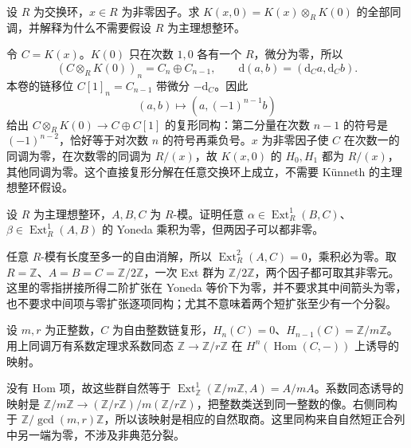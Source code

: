 \begin{exercise}\label{b4:ex:09-koszul-zero-factor}
	设 \(R\) 为交换环，\(x\in R\) 为非零因子。求 \(K(x,0)=K(x)\otimes_R K(0)\) 的全部同调，并解释为什么不需要假设 \(R\) 为主理想整环。
\end{exercise}
\begin{solution}
	令 \(C=K(x)\)。\(K(0)\) 只在次数 \(1,0\) 各有一个 \(R\)，微分为零，所以
	\[
		(C\otimes_RK(0))_n=C_n\oplus C_{n-1},\qquad \mathrm{d}(a,b)=(\mathrm{d}_Ca,\mathrm{d}_Cb).
	\]
	本卷的链移位 \(C[1]_n=C_{n-1}\) 带微分 \(-\mathrm{d}_C\)。因此
	\[
		(a,b)\longmapsto(a,(-1)^{n-1}b)
	\]
	给出 \(C\otimes_RK(0)\to C\oplus C[1]\) 的复形同构：第二分量在次数 \(n-1\) 的符号是 \((-1)^{n-2}\)，恰好等于对次数 \(n\) 的符号再乘负号。\(x\) 为非零因子使 \(C\) 在次数一的同调为零，在次数零的同调为 \(R/(x)\)，故 \(K(x,0)\) 的 \(H_0,H_1\) 都为 \(R/(x)\)，其他同调为零。这个直接复形分解在任意交换环上成立，不需要 Künneth 的主理想整环假设。
\end{solution}

\begin{exercise}\label{b4:ex:09-extension-zero-product}
	设 \(R\) 为主理想整环，\(A,B,C\) 为 \(R\)-模。证明任意 \(\alpha\in\operatorname{Ext}_R^1(B,C)\)、\(\beta\in\operatorname{Ext}_R^1(A,B)\) 的 Yoneda 乘积为零，但两因子可以都非零。
\end{exercise}
\begin{solution}
	任意 \(R\)-模有长度至多一的自由消解，所以 \(\operatorname{Ext}_R^2(A,C)=0\)，乘积必为零。取 \(R=\mathbb Z\)、\(A=B=C=\mathbb Z/2\mathbb Z\)，一次 Ext 群为 \(\mathbb Z/2\mathbb Z\)，两个因子都可取其非零元。这里的零指拼接所得二阶扩张在 Yoneda 等价下为零，并不要求其中间箭头为零，也不要求中间项与零扩张逐项同构；尤其不意味着两个短扩张至少有一个分裂。
\end{solution}

\begin{exercise}\label{b4:ex:09-uct-coefficient-map}
	设 \(m,r\) 为正整数，\(C\) 为自由整数链复形，\(H_n(C)=0\)、\(H_{n-1}(C)=\mathbb Z/m\mathbb Z\)。用上同调万有系数定理求系数同态 \(\mathbb Z\to\mathbb Z/r\mathbb Z\) 在 \(H^n(\operatorname{Hom}(C,-))\) 上诱导的映射。
\end{exercise}
\begin{solution}
	没有 Hom 项，故这些群自然等于 \(\operatorname{Ext}_{\mathbb Z}^1(\mathbb Z/m\mathbb Z,A)=A/mA\)。系数同态诱导的映射是 \(\mathbb Z/m\mathbb Z\to(\mathbb Z/r\mathbb Z)/m(\mathbb Z/r\mathbb Z)\)，把整数类送到同一整数的像。右侧同构于 \(\mathbb Z/\gcd(m,r)\mathbb Z\)，所以该映射是相应的自然取商。这里同构来自自然短正合列中另一端为零，不涉及非典范分裂。
\end{solution}

